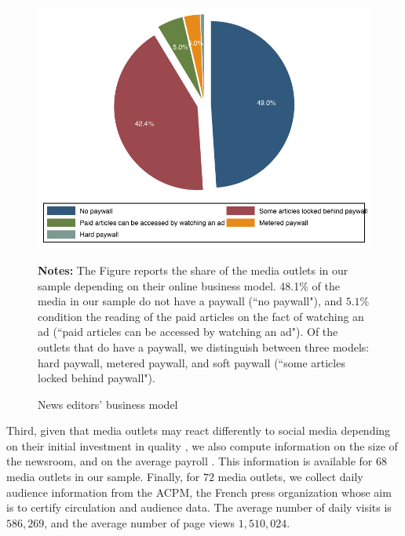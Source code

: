 \begin{figure}
\begin{center}
\includegraphics[scale=1]{figures/paywall_final}
\end{center}
	\begin{spacing}{0.5}
		{\footnotesize \textbf{Notes:} The Figure reports the share of the media outlets in our sample depending on their online business model. 48.1\% of the media in our sample do not have a paywall (``no paywall"), and $5.1\%$ condition the reading of the paid articles on the fact of watching an ad (``paid articles can be accessed by watching an ad"). Of the outlets that do have a paywall, we distinguish between three models: hard paywall, metered paywall, and soft paywall (``some articles locked behind paywall").}
	\end{spacing}
\vspace{.5cm}	
	\caption{News editors' business model}
	\label{fig:paywall_final}
\end{figure}


Third, given that media outlets may react differently to social media depending on their initial investment in quality \citep[see e.g.][]{deCorniereSarvary2019}, we also compute information on the size of the newsroom, and on the average payroll \citep{Cage2015_journalists}. This information is available for $68$ media outlets in our sample. Finally, for $72$ media outlets, we collect daily audience information from the ACPM, the French press organization whose aim is to certify circulation and audience data. The average number of daily visits is $586,269$, and the average number of page views $1,510,024$.


